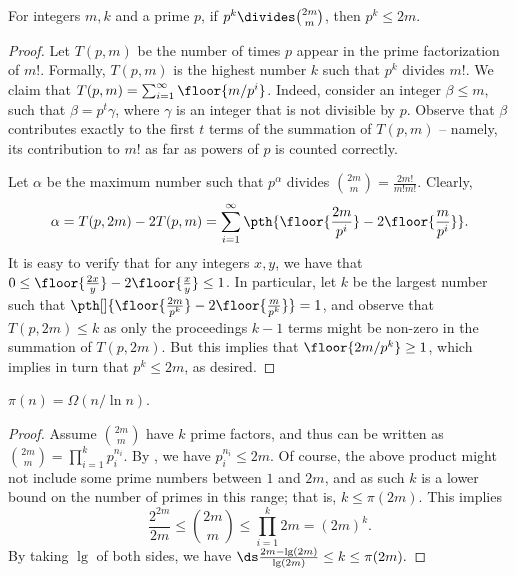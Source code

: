 \begin{lemma}
    For integers $m, k$ and a prime $p$, if $p^k \divides
    \binom{2m}{m}$, then $p^k \leq 2m$.
\end{lemma}
\begin{proof}
    Let $T(p,m)$ be the number of times $p$ appear in the prime
    factorization of $m!$. Formally, $T(p,m)$ is the highest number
    $k$ such that $p^k$ divides $m!$. We claim that $T(p,m) =
    \sum_{i=1}^{\infty} \floor{m / p^i}$. Indeed, consider an integer
    $\beta \leq m$, such that $\beta = p^t \gamma $, where $\gamma$ is
    an integer that is not divisible by $p$. Observe that $\beta$
    contributes exactly to the first $t$ terms of the summation of
    $T(p,m)$ -- namely, its contribution to $m!$ as far as powers of
    $p$ is counted correctly.

    Let $\alpha$ be the maximum number such that $p^\alpha$ divides
    $\binom{2m}{m} = \frac{2m!}{m! m!}$. Clearly, 
    \begin{align*}
        \alpha%
        =%
        T(p,2m) - 2T(p,m)%
        =%
        \sum_{i=1}^\infty \pth{ \floor{\frac{2m}{ p^i}} -2
           \floor{\frac{m}{p^i}}}.
    \end{align*}
    It is easy to verify that for any integers $x, y$, we have that $0
    \leq \floor{\frac{2x}{y}} - 2 \floor{\frac{x}{y}} \leq 1$. In
    particular, let $k$ be the largest number such that\newline
    $\pth[]{ \floor{\frac{2m}{ p^k}} -2 \floor{\frac{m}{p^k}}} =1$, and
    observe that $T(p, 2m) \leq k$ as only the proceedings $k-1$ terms
    might be non-zero in the summation of $T(p,2m)$. But this implies
    that $\floor{2m/p^k}\geq 1$, which implies in turn that $p^k \leq
    2m$, as desired.
\end{proof}

\begin{lemma}
    $\pi(n) = \Omega(n /\ln n)$.
\end{lemma}
\begin{proof}
    Assume $\binom{2m}{m}$ have $k$ prime factors, and thus can be
    written as
    \begin{math}
        \binom{2m}{m} = \prod_{i=1}^k{p_i^{n_i}}.
    \end{math}
    By , we have $p_i^{n_i} \le 2m$. Of
    course, the above product might not include some prime numbers
    between $1$ and $2m$, and as such $k$ is a lower bound on the
    number of primes in this range; that is, $k \leq \pi(2m)$.  This
    implies
    \begin{equation*}
        \frac{2^{2m}}{2m} \le \binom{2m}{m} \le 
        \prod_{i=1}^k{2m} = (2m)^k.
    \end{equation*}
    By taking $\lg$ of both sides, we have
    \begin{math}
        \ds \frac{2m - \lg(2m)}{\lg(2m)} \leq k \leq \pi(2m).
    \end{math}
\end{proof}


